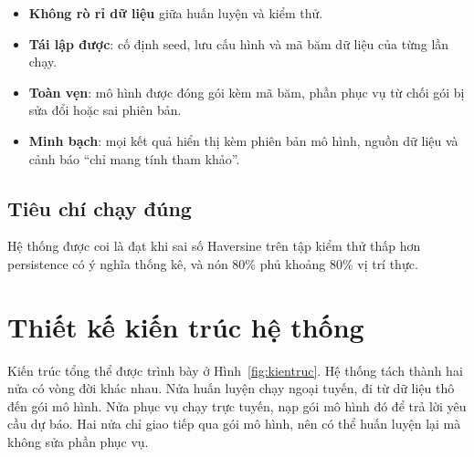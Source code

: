 \begin{itemize}[leftmargin=1.6em, itemsep=2pt]
  \item \textbf{Không rò rỉ dữ liệu} giữa huấn luyện và kiểm thử.
  \item \textbf{Tái lập được}: cố định seed, lưu cấu hình và mã băm dữ liệu
        của từng lần chạy.
  \item \textbf{Toàn vẹn}: mô hình được đóng gói kèm mã băm, phần phục vụ từ
        chối gói bị sửa đổi hoặc sai phiên bản.
  \item \textbf{Minh bạch}: mọi kết quả hiển thị kèm phiên bản mô hình, nguồn
        dữ liệu và cảnh báo ``chỉ mang tính tham khảo''.
\end{itemize}

\subsection{Tiêu chí chạy đúng}

Hệ thống được coi là đạt khi sai số Haversine trên tập kiểm thử thấp hơn
persistence có ý nghĩa thống kê, và nón 80\% phủ khoảng 80\% vị trí thực.

\section{Thiết kế kiến trúc hệ thống}

Kiến trúc tổng thể được trình bày ở Hình~\ref{fig:kientruc}. Hệ thống tách
thành hai nửa có vòng đời khác nhau. Nửa huấn luyện chạy ngoại tuyến, đi từ
dữ liệu thô đến gói mô hình. Nửa phục vụ chạy trực tuyến, nạp gói mô hình đó
để trả lời yêu cầu dự báo. Hai nửa chỉ giao tiếp qua gói mô hình, nên có thể
huấn luyện lại mà không sửa phần phục vụ.

